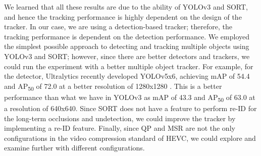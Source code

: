 We learned that all these results are due to the ability of YOLOv3 and SORT, and hence the tracking performance is highly dependent on the design of the tracker. In our case, we are using a detection-based tracker; therefore, the tracking performance is dependent on the detection performance. We employed the simplest possible approach to detecting and tracking multiple objects using YOLOv3 and SORT; however, since there are better detectors and trackers, we could run the experiment with a better multiple object tracker. For example, for the detector, Ultralytics recently developed YOLOv5x6, achieving mAP of 54.4 and AP\textsubscript{50} of 72.0 at a better resolution of 1280x1280 \cite{jocher_ultralyticsyolov5_2021}. This is a better performance than what we have in YOLOv3 as mAP of 43.3 and AP\textsubscript{50} of 63.0 at a resolution of 640x640. Since SORT does not have a feature to perform re-ID for the long-term occlusions and undetection, we could improve the tracker by implementing a re-ID feature. Finally, since QP and MSR are not the only configurations in the video compression standard of HEVC, we could explore and examine further with different configurations.